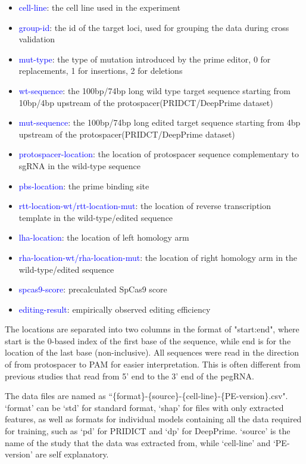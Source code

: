 \begin{itemize}[itemsep=-0mm]
    \item \textcolor{blue}{cell-line}: the cell line used in the experiment
    \item \textcolor{blue}{group-id}: the id of the target loci, used for grouping the data during cross validation
    \item \textcolor{blue}{mut-type}: the type of mutation introduced by the prime editor, 0 for replacements, 1 for insertions, 2 for deletions
    \item \textcolor{blue}{wt-sequence}: the 100bp/74bp long wild type target sequence starting from 10bp/4bp upstream of the protospacer(PRIDCT/DeepPrime dataset)
    \item \textcolor{blue}{mut-sequence}: the 100bp/74bp long edited target sequence starting from 4bp upstream of the protospacer(PRIDCT/DeepPrime dataset)
    \item \textcolor{blue}{protospacer-location}: the location of protospacer sequence complementary to sgRNA in the wild-type sequence 
    \item \textcolor{blue}{pbs-location}: the prime binding site
    \item \textcolor{blue}{rtt-location-wt/rtt-location-mut}: the location of reverse transcription template in the wild-type/edited sequence
    \item \textcolor{blue}{lha-location}: the location of left homology arm
    \item \textcolor{blue}{rha-location-wt/rha-location-mut}: the location of right homology arm in the wild-type/edited sequence
    \item \textcolor{blue}{spcas9-score}: precalculated SpCas9 score
    \item \textcolor{blue}{editing-result}: empirically observed editing efficiency
\end{itemize}

The locations are separated into two columns in the format of "start:end", where start is the 0-based index of the first base of the sequence, while end is for the location of the last base (non-inclusive). All sequences were read in the direction of from protospacer to PAM for easier interpretation. This is often different from previous studies that read from 5' end to the 3' end of the pegRNA.

The data files are named as ``\{format\}-\{source\}-\{cell-line\}-\{PE-version\}.csv". `format' can be `std' for standard format, `shap' for files with only extracted features, as well as formats for individual models containing all the data required for training, such as `pd' for PRIDICT and `dp' for DeepPrime. `source' is the name of the study that the data was extracted from, while `cell-line' and `PE-version' are self explanatory.

